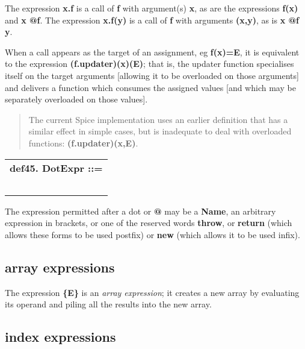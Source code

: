 \documentclass{report}
\begin{document}
The expression {\bf x.f} is a call of {\bf f} with argument(s) {\bf x}, as are the
expressions {\bf f(x)} and {\bf x @f}. The expression {\bf x.f(y)} is a call of
{\bf f} with arguments {\bf (x,y)}, as is {\bf x @f y}.

When a call appears as the target of an assignment, eg {\bf f(x)=E}, it is
equivalent to the expression {\bf (f.updater)(x)(E)}; that is, the updater
function specialises itself on the target arguments {[}allowing it to
be overloaded on those arguments{]} and delivers a function which consumes
the assigned values {[}and which may be separately overloaded on those values{]}.

\begin{quote}The current Spice implementation uses an earlier definition that has
a similar effect in simple cases, but is inadequate to deal with
overloaded functions: {\bf (f.updater)(x,E)}.\end{quote}\begin{tabular}{l}
{\bf def45. DotExpr ::= }\\ 
\hspace*{3mm}{\tt Name} \\ 
\hspace*{3mm}{\tt  $\mid$ "(" Expr ")"} \\ 
\hspace*{3mm}{\tt  $\mid$ "return"} \\ 
\hspace*{3mm}{\tt  $\mid$ "throw"} \\ 
\hspace*{3mm}{\tt  $\mid$ "new"} \\ 
\end{tabular}

The expression permitted after a dot or {\bf @} may be a {\bf Name}, an arbitrary
expression in brackets, or one of the reserved words {\bf throw}, or
{\bf return} (which allows these forms to be used postfix) or {\bf new} (which
allows it to be used infix).\subsection{array expressions}


The expression {\bf \{E\}} is an {\em array expression}; it creates a new array
by evaluating its operand and piling all the results into the new
array.\subsection{index expressions}
\end{document}
